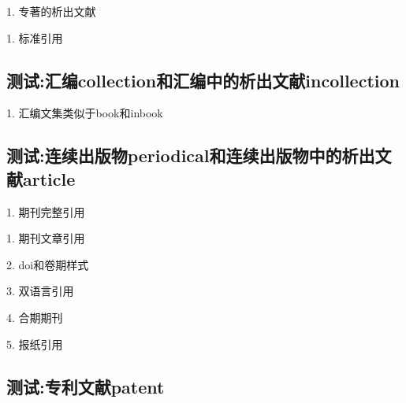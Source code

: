 \documentclass[11pt]{article} %
\begin{document}
\begin{refsection}

1. 专著的析出文献\cite{马克思2013-302-302}\cite{王夫之2011-1109-1109}

\printbibliography[heading=bibliography,title=【专著中的析出文献】]
\end{refsection}

\begin{refsection}
1. 标准引用\cite{book3}

\printbibliography[heading=bibliography,title=【标准】]
\end{refsection}

\subsection{测试:汇编collection和汇编中的析出文献incollection}
\begin{refsection}
1. 汇编文集类似于book和inbook
\cite{ainbook2,中国职工教育研究会1985--}

\printbibliography[heading=bibliography,title=【汇编或文集】]
\end{refsection}


\subsection{测试:连续出版物periodical和连续出版物中的析出文献article}

\begin{refsection}
1. 期刊完整引用\cite{periodical2}\cite{中华医学会湖北分会1984--}

\printbibliography[heading=bibliography,title=【连续出版物】]
\end{refsection}

\begin{refsection}
1. 期刊文章引用\cite{Chiani2003-840-845}

2. doi和卷期样式\cite{储大同2010-721-724}

3. 双语言引用\cite{bilangchenzhang}

4. 合期期刊\cite{储大同2010-721-724m}

5. 报纸引用\cite{傅刚2000--}

\printbibliography[heading=bibliography,title=【连续出版物中的析出文献】]
\end{refsection}

\subsection{测试:专利文献patent}
\end{document}

